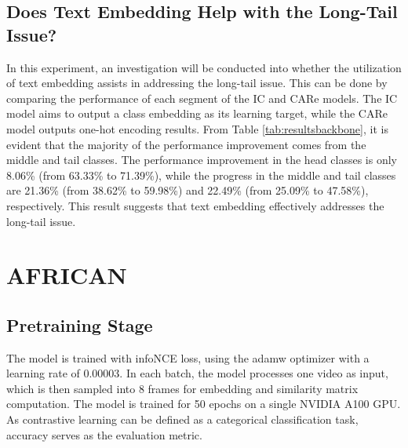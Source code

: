 \subsection{Does Text Embedding Help with the Long-Tail Issue?}
In this experiment, an investigation will be conducted into whether the utilization of text embedding assists in addressing the long-tail issue. This can be done by comparing the performance of each segment of the IC and CARe models. The IC model aims to output a class embedding as its learning target, while the CARe model outputs one-hot encoding results. From Table \ref{tab:resultsbackbone}, it is evident that the majority of the performance improvement comes from the middle and tail classes. The performance improvement in the head classes is only 8.06\% (from 63.33\% to 71.39\%), while the progress in the middle and tail classes are 21.36\% (from 38.62\% to 59.98\%) and 22.49\% (from 25.09\% to 47.58\%), respectively. This result suggests that text embedding effectively addresses the long-tail issue. 




\section{AFRICAN}
\subsection{Pretraining Stage}
The model is trained with infoNCE \parencite{oord2019representation} loss, using the adamw optimizer with a learning rate of 0.00003. In each batch, the model processes one video as input, which is then sampled into 8 frames for embedding and similarity matrix computation. The model is trained for 50 epochs on a single NVIDIA A100 GPU. As contrastive learning can be defined as a categorical classification task, accuracy serves as the evaluation metric.

